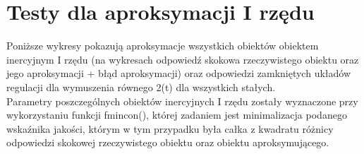 \documentclass[10pt,a4paper]{article}
\begin{document}
\newpage 
\section{Testy dla aproksymacji I rzędu}

Poniższe wykresy pokazują aproksymacje wszystkich obiektów obiektem inercyjnym I rzędu (na wykresach odpowiedź skokowa rzeczywistego obiektu oraz jego aproksymacji + błąd aproksymacji) oraz odpowiedzi zamkniętych układów regulacji dla wymuszenia równego 2(t) dla wszystkich stałych.\\
Parametry poszczególnych obiektów inercyjnych I rzędu zostały wyznaczone przy wykorzystaniu funkcji fmincon(), której zadaniem jest minimalizacja podanego wskaźnika jakości, którym w tym przypadku była całka z kwadratu różnicy odpowiedzi skokowej rzeczywistego obiektu oraz obiektu aproksymującego.

\newpage
\end{document}
